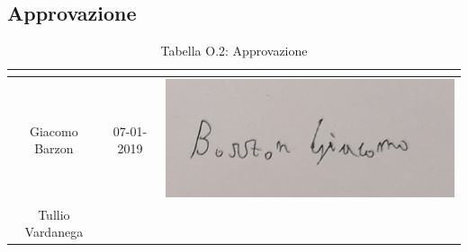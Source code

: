 \subsection{Approvazione}
\renewcommand{\arraystretch}{2}
\begin{table}[H]
\begin{center}
  \begin{tabular}{| c | c | c |}
    \hline
    \rowcolor{title_row}
    \textbf{\color{title_text}{Nominativo}} & \textbf{\color{title_text}{Data}} & \textbf{\color{title_text}{Firma}} \\ \hline
    Giacomo Barzon & 07-01-2019 & \includegraphics[align=c,scale=0.25]{Res/Firme/giacomo.jpg} \\ \hline
    Tullio Vardanega &  &  \\
    \hline
  \end{tabular}
  \caption{Tabella O.2: Approvazione\label{}}
\end{center}
\end{table}
\renewcommand{\arraystretch}{1}

